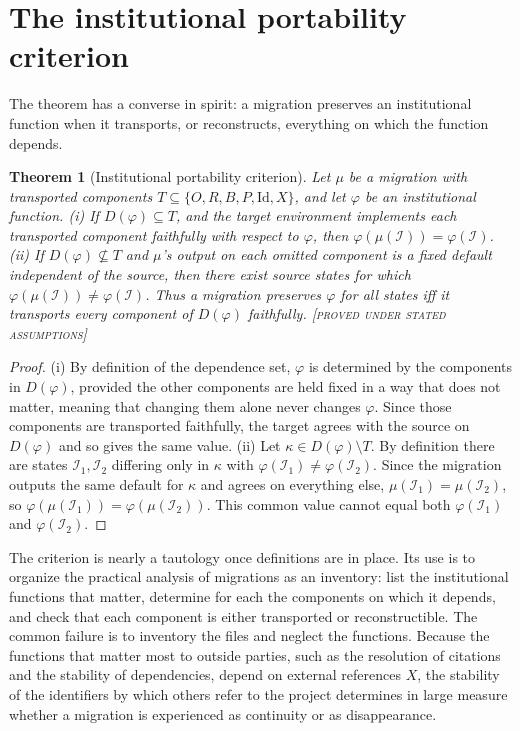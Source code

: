 \documentclass[11pt,twoside,openright]{book}
\theoremstyle{plain}
\newtheorem{theorem}{Theorem}[chapter]
\theoremstyle{definition}
\theoremstyle{remark}
\newcommand{\Proved}{\textup{\textsc{[proved under stated assumptions]}}}
\begin{document}
\section{The institutional portability criterion}

The theorem has a converse in spirit: a migration preserves an institutional function when it transports, or reconstructs, everything on which the function depends.

\begin{theorem}[Institutional portability criterion]\label{thm:portability}
Let $\mu$ be a migration with transported components $T\subseteq\{O,R,B,P,\mathrm{Id},X\}$, and let $\varphi$ be an institutional function. (i) If $D(\varphi)\subseteq T$, and the target environment implements each transported component faithfully with respect to $\varphi$, then $\varphi(\mu(\mathcal{I}))=\varphi(\mathcal{I})$. (ii) If $D(\varphi)\not\subseteq T$ and $\mu$'s output on each omitted component is a fixed default independent of the source, then there exist source states for which $\varphi(\mu(\mathcal{I}))\ne\varphi(\mathcal{I})$. Thus a migration preserves $\varphi$ for all states iff it transports every component of $D(\varphi)$ faithfully.
\Proved{}
\end{theorem}

\begin{proof}
(i) By definition of the dependence set, $\varphi$ is determined by the components in $D(\varphi)$, provided the other components are held fixed in a way that does not matter, meaning that changing them alone never changes $\varphi$. Since those components are transported faithfully, the target agrees with the source on $D(\varphi)$ and so gives the same value. (ii) Let $\kappa\in D(\varphi)\setminus T$. By definition there are states $\mathcal{I}_1,\mathcal{I}_2$ differing only in $\kappa$ with $\varphi(\mathcal{I}_1)\neq\varphi(\mathcal{I}_2)$. Since the migration outputs the same default for $\kappa$ and agrees on everything else, $\mu(\mathcal{I}_1)=\mu(\mathcal{I}_2)$, so $\varphi(\mu(\mathcal{I}_1))=\varphi(\mu(\mathcal{I}_2))$. This common value cannot equal both $\varphi(\mathcal{I}_1)$ and $\varphi(\mathcal{I}_2)$.
\end{proof}

The criterion is nearly a tautology once definitions are in place. Its use is to organize the practical analysis of migrations as an inventory: list the institutional functions that matter, determine for each the components on which it depends, and check that each component is either transported or reconstructible. The common failure is to inventory the files and neglect the functions. Because the functions that matter most to outside parties, such as the resolution of citations and the stability of dependencies, depend on external references $X$, the stability of the identifiers by which others refer to the project determines in large measure whether a migration is experienced as continuity or as disappearance.
\end{document}

